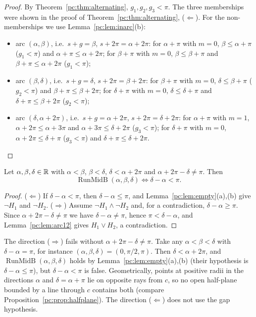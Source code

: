 \begin{proof}
By Theorem~\ref{pc:thm:alternating}, $g_1,g_2,g_3<\pi$. The three memberships were shown in the proof of
Theorem~\ref{pc:thm:alternating}, ($\Leftarrow$). For the non-memberships we use Lemma~\ref{pc:lem:inarc}(b):
\begin{itemize}
\item arc $(\alpha,\beta)$, i.e.\ $s+g=\beta$, $s+2\pi=\alpha+2\pi$: for $\alpha+\pi$ with $m=0$,
  $\beta\le\alpha+\pi$ ($g_1<\pi$) and $\alpha+\pi\le\alpha+2\pi$; for $\beta+\pi$ with $m=0$, $\beta\le\beta+\pi$
  and $\beta+\pi\le\alpha+2\pi$ ($g_1<\pi$);
\item arc $(\beta,\delta)$, i.e.\ $s+g=\delta$, $s+2\pi=\beta+2\pi$: for $\beta+\pi$ with $m=0$,
  $\delta\le\beta+\pi$ ($g_2<\pi$) and $\beta+\pi\le\beta+2\pi$; for $\delta+\pi$ with $m=0$, $\delta\le\delta+\pi$
  and $\delta+\pi\le\beta+2\pi$ ($g_2<\pi$);
\item arc $(\delta,\alpha+2\pi)$, i.e.\ $s+g=\alpha+2\pi$, $s+2\pi=\delta+2\pi$: for $\alpha+\pi$ with $m=1$,
  $\alpha+2\pi\le\alpha+3\pi$ and $\alpha+3\pi\le\delta+2\pi$ ($g_3<\pi$); for $\delta+\pi$ with $m=0$,
  $\alpha+2\pi\le\delta+\pi$ ($g_3<\pi$) and $\delta+\pi\le\delta+2\pi$.\qedhere
\end{itemize}
\end{proof}

\begin{theorem}\label{pc:thm:runB}
Let $\alpha,\beta,\delta\in\mathbb R$ with $\alpha<\beta$, $\beta<\delta$, $\delta<\alpha+2\pi$ and
$\alpha+2\pi-\delta\neq\pi$. Then
\[
  \operatorname{RunMidB}(\alpha,\beta,\delta)\iff\delta-\alpha<\pi .
\]
\end{theorem}

\begin{proof}
($\Leftarrow$) If $\delta-\alpha<\pi$, then $\delta-\alpha\le\pi$, and Lemma~\ref{pc:lem:empty}(a),(b) give
$\neg H_1$ and $\neg H_2$.
($\Rightarrow$) Assume $\neg H_1\wedge\neg H_2$ and, for a contradiction, $\delta-\alpha\ge\pi$. Since
$\alpha+2\pi-\delta\neq\pi$ we have $\delta-\alpha\neq\pi$, hence $\pi<\delta-\alpha$, and
Lemma~\ref{pc:lem:arc12} gives $H_1\vee H_2$, a contradiction.
\end{proof}

\begin{remark}\label{pc:rem:runB-example}
The direction ($\Rightarrow$) fails without $\alpha+2\pi-\delta\neq\pi$. Take any $\alpha<\beta<\delta$ with
$\delta-\alpha=\pi$, for instance $(\alpha,\beta,\delta)=(0,\pi/2,\pi)$. Then $\delta<\alpha+2\pi$, and
$\operatorname{RunMidB}(\alpha,\beta,\delta)$ holds by Lemma~\ref{pc:lem:empty}(a),(b) (their hypothesis is
$\delta-\alpha\le\pi$), but $\delta-\alpha<\pi$ is false. Geometrically, points at positive radii in the
directions $\alpha$ and $\delta=\alpha+\pi$ lie on opposite rays from $c$, so no open half-plane bounded by a line
through $c$ contains both (compare Proposition~\ref{pc:prop:halfplane}). The direction ($\Leftarrow$) does not use
the gap hypothesis.
\end{remark}

